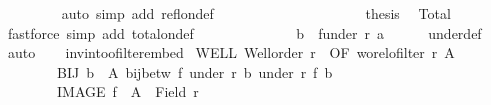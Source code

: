 \begin{isabellebody}
\ \ \ \ \ \ \ \isamarkupfalse%
\ {\isacharparenleft}{\kern0pt}auto\ simp\ add{\isacharcolon}{\kern0pt}\ refl{\isacharunderscore}{\kern0pt}on{\isacharunderscore}{\kern0pt}def{\isacharparenright}{\kern0pt}\isanewline
\ \ \ \ \ \ \isacommand{{\isacharbraceright}{\kern0pt}}\isamarkupfalse%
\isanewline
\ \ \ \ \ \ \isamarkupfalse%
\isanewline
\ \ \ \ \ \ \isamarkupfalse%
\ {\isacharquery}{\kern0pt}thesis\ \isamarkupfalse%
\ Total\ {\isacharasterisk}{\kern0pt}{\isacharasterisk}{\kern0pt}{\isacharasterisk}{\kern0pt}{\isacharasterisk}{\kern0pt}\ {}\ \isamarkupfalse%
\ {\isacharparenleft}{\kern0pt}fastforce\ simp\ add{\isacharcolon}{\kern0pt}\ total{\isacharunderscore}{\kern0pt}on{\isacharunderscore}{\kern0pt}def{\isacharparenright}{\kern0pt}\isanewline
\ \ \ \ \isamarkupfalse%
\isanewline
\ \ \ \ \isamarkupfalse%
\ {}\ \isamarkupfalse%
\ \ {\isachardoublequoteopen}b{\isacharprime}{\kern0pt}\ {\isasymin}\ f{\isacharbackquote}{\kern0pt}{\isacharparenleft}{\kern0pt}under\ r\ a{\isacharparenright}{\kern0pt}{\isachardoublequoteclose}\isanewline
\ \ \ \ \isamarkupfalse%
\ under{\isacharunderscore}{\kern0pt}def\ \isamarkupfalse%
\ auto\isanewline
\ \ \isamarkupfalse%
\isanewline
{}\isamarkupfalse%
%
\endisatagproof
{\isafoldproof}%
%
\isadelimproof
\isanewline
%
\endisadelimproof
\isanewline
{}\isamarkupfalse%
\ inv{\isacharunderscore}{\kern0pt}into{\isacharunderscore}{\kern0pt}ofilter{\isacharunderscore}{\kern0pt}embed{\isacharcolon}{\kern0pt}\isanewline
{}\ WELL{\isacharcolon}{\kern0pt}\ {\isachardoublequoteopen}Well{\isacharunderscore}{\kern0pt}order\ r{\isachardoublequoteclose}\ \ OF{\isacharcolon}{\kern0pt}\ {\isachardoublequoteopen}wo{\isacharunderscore}{\kern0pt}rel{\isachardot}{\kern0pt}ofilter\ r\ A{\isachardoublequoteclose}\ \isanewline
\ \ \ \ \ \ \ \ BIJ{\isacharcolon}{\kern0pt}\ {\isachardoublequoteopen}{\isasymforall}b\ {\isasymin}\ A{\isachardot}{\kern0pt}\ bij{\isacharunderscore}{\kern0pt}betw\ f\ {\isacharparenleft}{\kern0pt}under\ r\ b{\isacharparenright}{\kern0pt}\ {\isacharparenleft}{\kern0pt}under\ r{\isacharprime}{\kern0pt}\ {\isacharparenleft}{\kern0pt}f\ b{\isacharparenright}{\kern0pt}{\isacharparenright}{\kern0pt}{\isachardoublequoteclose}\ \isanewline
\ \ \ \ \ \ \ \ IMAGE{\isacharcolon}{\kern0pt}\ {\isachardoublequoteopen}f\ {\isacharbackquote}{\kern0pt}\ A\ {\isacharequal}{\kern0pt}\ Field\ r{\isacharprime}{\kern0pt}{\isachardoublequoteclose}\isanewline

\end{isabellebody}
